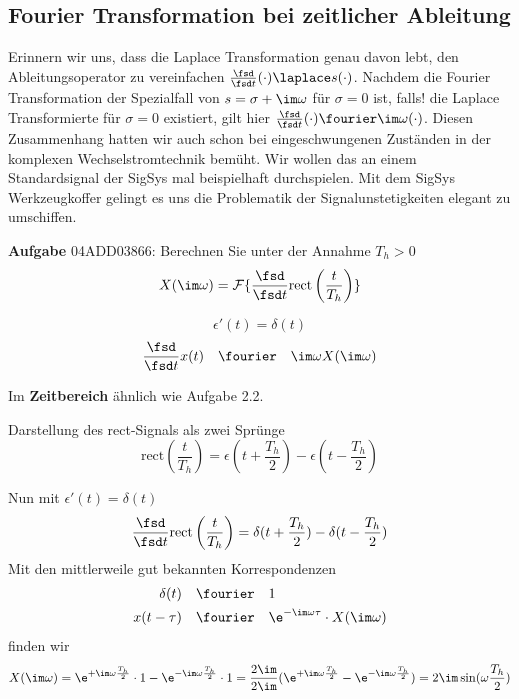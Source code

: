 \subsection{Fourier Transformation bei zeitlicher Ableitung}
\label{sec:04ADD03866}
\begin{Ziel}
Erinnern wir uns, dass die Laplace Transformation genau davon lebt, den
Ableitungsoperator zu vereinfachen $\frac{\fsd}{\fsd t}(\cdot) \laplace s(\cdot)$.
Nachdem  die Fourier Transformation der Spezialfall von $s=\sigma+\im\omega$ für
$\sigma=0$ ist, falls! die Laplace Transformierte für $\sigma=0$ existiert,
gilt hier $\frac{\fsd}{\fsd t}(\cdot) \fourier \im\omega(\cdot)$. Diesen Zusammenhang
hatten wir auch schon bei eingeschwungenen Zuständen in der komplexen Wechselstromtechnik
bemüht.
Wir wollen das an einem Standardsignal der SigSys mal beispielhaft
durchspielen. Mit dem SigSys Werkzeugkoffer gelingt es uns die Problematik der
Signalunstetigkeiten elegant zu umschiffen.
\end{Ziel}
\textbf{Aufgabe} {\tiny 04ADD03866}: Berechnen Sie unter der Annahme $T_h>0$
\begin{equation}
  X(\im\omega) = \mathcal{F}\{\frac{\fsd}{\fsd t} \mathrm{rect}\left(\frac{t}{T_h}\right)\}
\end{equation}
\begin{Werkzeug}
\begin{equation}
  \epsilon'(t) = \delta(t)
\end{equation}
\begin{equation}
\frac{\fsd}{\fsd t} x(t) \quad\fourier\quad \im\omega X(\im\omega)
\end{equation}
\end{Werkzeug}
\begin{Ansatz}
Im \textbf{Zeitbereich} ähnlich wie Aufgabe 2.2.

Darstellung des rect-Signals als zwei Sprünge
\begin{equation}
  \mathrm{rect}\left(\frac{t}{T_h}\right) = \epsilon(t+\frac{T_h}{2}) - \epsilon(t-\frac{T_h}{2})
\end{equation}
\end{Ansatz}

\begin{ExCalc}
Nun mit $\epsilon'(t) = \delta(t)$
\begin{equation}
\frac{\fsd}{\fsd t} \mathrm{rect}\left(\frac{t}{T_h}\right) = \delta(t+\frac{T_h}{2}) - \delta(t-\frac{T_h}{2})
\end{equation}
Mit den mittlerweile gut bekannten Korrespondenzen
\begin{align}
\delta(t) &\quad \fourier \quad 1\\
x(t-\tau) &\quad \fourier \quad \e^{-\im\omega\tau} \cdot X(\im\omega)
\end{align}
finden wir
\begin{equation}
X(\im\omega) = \e^{+\im\omega\frac{T_h}{2}}\cdot 1 - \e^{-\im\omega\frac{T_h}{2}}\cdot 1
= \frac{2\im}{2\im}(\e^{+\im\omega\frac{T_h}{2}} - \e^{-\im\omega\frac{T_h}{2}})
= 2\im \sin(\omega\frac{T_h}{2})
\end{equation}
\end{ExCalc}

